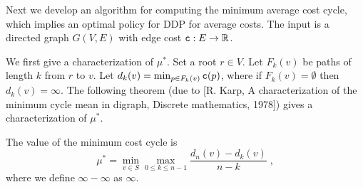 Next we develop an algorithm for computing the minimum average cost
cycle, which implies an optimal policy for DDP for average costs.
The input is a directed graph $G(V,E)$ with edge cost ${\tt c}:E\rightarrow {\mathbb R}$.

We first give a characterization of $\mu^*$. Set a root $r\in V$.
Let $F_{k}(v)$ be paths of length $k$ from $r$ to $v$. Let
$d_{k}(v)=\min_{p\in F_{k}(v)} {\tt c}(p)$, where if
$F_{k}(v)=\emptyset$ then $d_{k}(v)=\infty$. The following theorem
(due to [R. Karp, A characterization of the minimum cycle mean in
digraph, Discrete mathematics, 1978]) gives a characterization of
$\mu^*$.

\begin{theorem}
The value of the minimum cost cycle is
\[
\mu^*=\min_{v\in S} \max_{0\leq k \leq n-1}
\frac{d_n(v)-d_{k}(v)}{n-k}\;,
\]
where we define $\infty-\infty$ as $\infty$.
\end{theorem}

